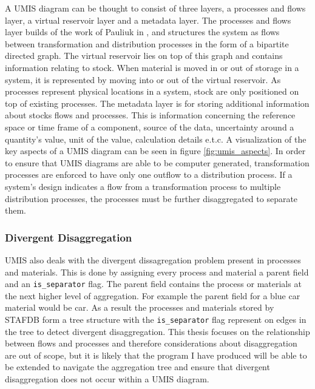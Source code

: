 \documentclass[ %
                    author={Tom Jager},
                supervisor={Dr. Daniel Schien},
                    degree={MEng},
                     title={A Bayesian Inference Engine for UMIS Structured Data},
                  subtitle={},
                      type={research},
                      year={2019} ]{dissertation}
\begin{document}
A UMIS diagram can be thought to consist of three layers, a processes and flows layer, a virtual reservoir layer and a metadata layer. The processes and flows layer builds of the work of Pauliuk in \cite{pauliuk2015general}, and structures the system as flows between transformation and distribution processes in the form of a bipartite directed graph. The virtual reservoir lies on top of this graph and contains information relating to stock. When material is moved in or out of storage in a system, it is represented by moving into or out of the virtual reservoir. As processes represent physical locations in a system, stock are only positioned on top of existing processes. The metadata layer is for storing additional information about stocks flows and processes. This is information concerning the reference space or time frame of a component, source of the data, uncertainty around a quantity's value, unit of the value, calculation details e.t.c. A visualization of the key aspects of a UMIS diagram can be seen in figure \ref{fig:umis_aspects}. In order to ensure that UMIS diagrams are able to be computer generated, transformation processes are enforced to have only one outflow to a distribution process. If a system's design indicates a flow from a transformation process to multiple distribution processes, the processes must be further disaggregated to separate them. 

\subsubsection{Divergent Disaggregation}
UMIS also deals with the divergent dissagregation problem present in processes and materials. This is done by assigning every process and material a parent field and an \texttt{is\_separator} flag. The parent field contains the process or materials at the next higher level of aggregation. For example the parent field for a blue car material would be car. As a result the processes and materials stored by STAFDB form a tree structure with the \texttt{is\_separator} flag represent on edges in the tree to detect divergent disaggregation. This thesis focuses on the relationship between flows and processes and therefore considerations about disaggregation are out of scope, but it is likely that the program I have produced will be able to be extended to navigate the aggregation tree and ensure that divergent disaggregation does not occur within a UMIS diagram.
\end{document}

